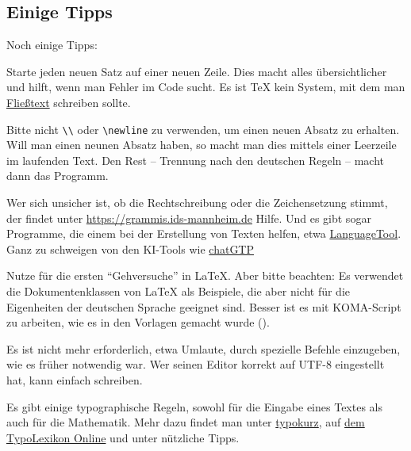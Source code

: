 \subsection{Einige Tipps }
Noch einige Tipps: 

\begin{myenumerate}
	\item
	Starte jeden neuen Satz auf einer neuen Zeile.
	Dies macht alles übersichtlicher und hilft, wenn man Fehler im Code sucht.
	Es ist \TeX{} kein System, mit dem man \href{https://de.wikipedia.org/wiki/Fließtext}{Fließtext} schreiben sollte.
	
	\item
	Bitte nicht \verb!\\! oder \verb!\newline! zu verwenden, um einen neuen Absatz zu erhalten.
	Will man einen neunen Absatz haben, so macht man dies mittels einer Leerzeile im laufenden Text.
	Den Rest -- Trennung nach den deutschen Regeln \ua -- macht dann das Programm.
	
	\item
	Wer sich unsicher ist, ob die Rechtschreibung oder die Zeichensetzung stimmt, der findet unter 
	\href{https://grammis.ids-mannheim.de}{https://grammis.ids-mannheim.de} Hilfe.
	Und es gibt sogar Programme, die einem bei der Erstellung von Texten helfen, etwa \href{https://languagetool.org/de}{LanguageTool}.
	Ganz zu schweigen von den KI-Tools wie \href{https://openai.com/blog/chatgpt/}{chatGTP }
	
	\item
	Nutze \textcite{lshort-german} für die ersten \enquote{Gehversuche} in \LaTeX\@.
	Aber bitte beachten: Es verwendet die Dokumentenklassen von \LaTeX{} als Beispiele, die aber nicht für die Eigenheiten der deutschen Sprache geeignet sind.
	Besser ist es mit KOMA-Script zu arbeiten, wie es in den Vorlagen gemacht wurde (\textcite{kohm:2020}).
	
	\item
	Es ist nicht mehr erforderlich, etwa Umlaute, durch spezielle Befehle einzugeben, wie es früher notwendig war.
	Wer seinen Editor korrekt auf UTF-8 eingestellt hat, kann einfach schreiben.
	
	\item
	Es gibt einige typographische Regeln, sowohl für die Eingabe eines Textes als auch für die Mathematik.
	Mehr dazu findet man unter \href{http://menetekel.e-technik.fh-muenchen.de/skripten/LaTeX/typokurz.pdf}{typokurz}, auf \href{https://www.typolexikon.de}{dem TypoLexikon Online} und unter \textcite{nadler:formelsatz} nützliche Tipps.
	

\end{myenumerate}
